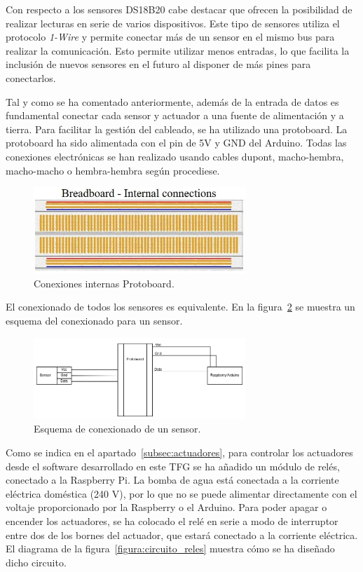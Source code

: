 \documentclass[a4paper, 12pt, oneside]{book}
\begin{document}
Con respecto a los sensores DS18B20 cabe destacar que ofrecen la posibilidad de realizar lecturas en serie de varios dispositivos. Este tipo de sensores utiliza el protocolo \textit{1-Wire} y permite conectar más de un sensor en el mismo bus para realizar la comunicación. Esto permite utilizar menos entradas, lo que facilita la inclusión de nuevos sensores en el futuro al disponer de más pines para conectarlos.

Tal y como se ha comentado anteriormente, además de la entrada de datos es fundamental conectar cada sensor y actuador a una fuente de alimentación y a tierra. Para facilitar la gestión del cableado, se ha utilizado una protoboard. La protoboard ha sido alimentada con el pin de 5V y GND del Arduino. Todas las conexiones electrónicas se han realizado usando cables dupont, macho-hembra, macho-macho o hembra-hembra según procediese.

\begin{figure}[H]
	\centering
    \includegraphics[width=8cm, keepaspectratio]{img/protoboard-conexiones-internas}
    \caption{Conexiones internas Protoboard.}
    \label{figura:conexiones_protoborad}
\end{figure}

El conexionado de todos los sensores es equivalente. En la figura~\ref{figura:conexion_sensor} se muestra un esquema del conexionado para un sensor.
\begin{figure}[H]
	\centering
    \includegraphics[width=8cm, keepaspectratio]{img/conexion_sensor}
    \caption{Esquema de conexionado de un sensor.}
    \label{figura:conexion_sensor}
\end{figure}


Como se indica en el apartado~\ref{subsec:actuadores}, para controlar los actuadores desde el software desarrollado en este TFG se ha añadido un módulo de relés, conectado a la Raspberry Pi. La bomba de agua está conectada a la corriente eléctrica doméstica (240 V), por lo que no se puede alimentar directamente con el voltaje proporcionado por la Raspberry o el Arduino. Para poder apagar o encender los actuadores, se ha colocado el relé en serie a modo de interruptor entre dos de los bornes del actuador, que estará conectado a la corriente eléctrica.
El diagrama de la figura~\ref{figura:circuito_reles} muestra cómo se ha diseñado dicho circuito.
\end{document}
